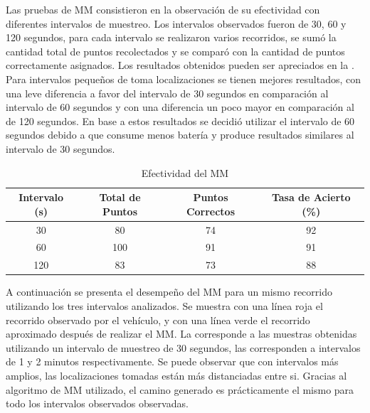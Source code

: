 Las pruebas de MM consistieron en la observación de su efectividad con diferentes intervalos de muestreo. Los intervalos observados fueron de 30, 60 y 120 segundos, para cada intervalo se realizaron varios recorridos, se sumó la cantidad total de puntos recolectados y se comparó con la cantidad de puntos correctamente asignados. Los resultados obtenidos pueden ser apreciados en la . Para intervalos pequeños de toma localizaciones se tienen mejores resultados, con una leve diferencia a favor del intervalo de 30 segundos en comparación al intervalo de 60 segundos y con una diferencia un poco mayor en comparación al de 120 segundos. En base a estos resultados se decidió utilizar el intervalo de 60 segundos debido a que consume menos batería y produce resultados similares al intervalo de 30 segundos.

\begin{table}[h]
	\centering
	\begin{tabular}{cccc}
        \toprule
    	Intervalo (s) & Total de Puntos & Puntos Correctos & Tasa de Acierto (\%)\\
    	\midrule
    	30 & 80  & 74 & 92 \\
    	60 & 100 & 91 & 91 \\
    	120 & 83 & 73 & 88 \\ 
    	\bottomrule
	\end{tabular}
	\caption{Efectividad del MM} 
	\label{table:map_matching}
\end{table}

A continuación se presenta el desempeño del MM para un mismo recorrido utilizando los tres intervalos analizados. Se muestra con una línea roja el recorrido observado por el vehículo, y con una línea verde el recorrido aproximado después de realizar el MM. La  corresponde a las muestras obtenidas utilizando un intervalo de muestreo de 30 segundos, las  corresponden a intervalos de 1 y 2 minutos respectivamente. Se puede observar que con intervalos más amplios, las localizaciones tomadas están más distanciadas entre si. Gracias al algoritmo de MM utilizado, el camino generado es prácticamente el mismo para todo los intervalos observados observadas.

